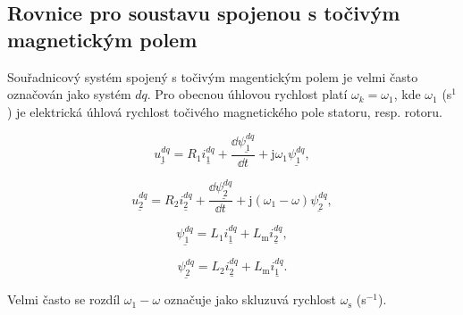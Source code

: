 \documentclass[a4paper, twoside, 11pt]{article}
\begin{document}
    \subsection{Rovnice pro soustavu spojenou s točivým magnetickým polem}
    Souřadnicový systém spojený s točivým magentickým polem je velmi často označován jako systém $dq$. Pro obecnou úhlovou rychlost platí $\omega_k = \omega_1$, kde $\omega_1$ (s$^{1}$) je elektrická úhlová rychlost točivého magnetického pole statoru, resp. rotoru.

 \begin{equation}
     \underline{u_{1}^{dq}} = R_1 \underline{i_1^{dq}} + \frac{\dd{\underline{\psi_1^{dq}}}}{\dd{t}} + \text{j} \omega_1 \underline{\psi_1^{dq}},
    \end{equation}

    \begin{equation}
        \underline{u_{2}^{dq}} = R_2 \underline{i_2^{dq}} + \frac{\dd{\underline{\psi_2^{dq}}}}{\dd{t}} + \text{j} (\omega_1 - \omega) \underline{\psi_2^{dq}},
    \end{equation}

    \begin{equation}
        \underline{\psi_1^{dq}} = L_1 \underline{i_1^{dq}} + L_\text{m} \underline{i_2^{dq}},
    \end{equation}

    \begin{equation}
        \underline{\psi_2^{dq}} = L_2 \underline{i_2^{dq}} + L_\text{m} \underline{i_1^{dq}}.
    \end{equation}

    Velmi často se rozdíl $\omega_1 - \omega$ označuje jako skluzuvá rychlost $\omega_\text{s}$ (s$^{-1}$).
\end{document}
